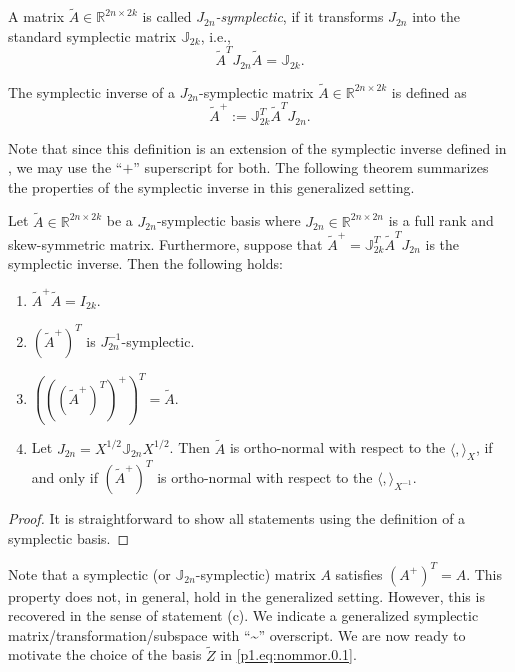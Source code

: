 \begin{definition}
A matrix $\tilde A\in \mathbb R^{2n\times 2k}$ is called \emph{$J_{2n}$-symplectic}, if it transforms $J_{2n}$ into the standard symplectic matrix $\mathbb J_{2k}$, i.e.,
\begin{equation} \label{p1.eq:nommor.0.3}
	\tilde A^T J_{2n} \tilde A = \mathbb J_{2k}.
\end{equation}
\end{definition}

\begin{definition}
The symplectic inverse of a $J_{2n}$-symplectic matrix $\tilde A\in \mathbb R^{2n\times 2k}$ is defined as
\begin{equation} \label{p1.eq:nommor.0.4}
	\tilde A^{+} := \mathbb J_{2k}^T \tilde A^T J_{2n}.
\end{equation}
\end{definition}
Note that since this definition is an extension of the symplectic inverse defined in \cite{doi:10.1137/140978922}, we may use the ``$+$'' superscript for both. The following theorem summarizes the properties of the symplectic inverse in this generalized setting.

\begin{proposition} \label{thm:4.1}
Let $\tilde A\in \mathbb R^{2n\times 2k}$ be a $J_{2n}$-symplectic basis where $J_{2n}\in\mathbb R^{2n\times 2n}$ is a full rank and skew-symmetric matrix. Furthermore, suppose that $\tilde A^{+} = \mathbb{J}_{2k}^T \tilde A^T J_{2n}$ is the symplectic inverse. Then the following holds:
\begin{enumerate}[$\qquad$(a)]
\item $\tilde A^+ \tilde A = I_{2k}$.
\item $(\tilde A^+)^T$ is $J_{2n}^{-1}$-symplectic.
\item $\left(\left(\left(\tilde A^+\right)^T\right)^+\right)^T = \tilde A$.
\item Let $J_{2n}=X^{1/2}\mathbb J_{2n} X^{1/2}$. Then $\tilde A$ is ortho-normal with respect to the $\langle,\rangle_X$, if and only if $(\tilde A^+)^T$ is ortho-normal with respect to the $\langle,\rangle_{X^{-1}}$.
\end{enumerate}
\end{proposition}
\begin{proof}
It is straightforward to show all statements using the definition of a symplectic basis.
\end{proof}

Note that a symplectic (or $\mathbb J_{2n}$-symplectic) matrix $A$ satisfies $(A^+)^T = A$. This property does not, in general, hold in the generalized setting. However, this is recovered in the sense of statement (c). We indicate a generalized symplectic matrix/transformation/subspace with ``\textasciitilde'' overscript. We are now ready to motivate the choice of the basis $\tilde Z$ in \eqref{p1.eq:nommor.0.1}.

